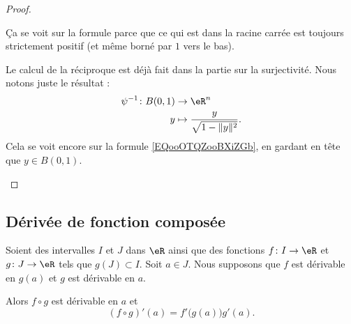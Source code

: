 \begin{proof}
\begin{subproof}
		Ça se voit sur la formule parce que ce qui est dans la racine carrée est toujours strictement positif (et même borné par \( 1\) vers le bas).

		Le calcul de la réciproque est déjà fait dans la partie sur la surjectivité. Nous notons juste le résultat :
		\begin{equation}		\label{EQooOTQZooBXiZGb}
			\begin{aligned}
				\psi^{-1}\colon B(0,1) & \to \eR^n                                   \\
				y                      & \mapsto \frac{ y }{ \sqrt{ 1-\| y \|^2 } }.
			\end{aligned}
		\end{equation}
		Cela se voit encore sur la formule \eqref{EQooOTQZooBXiZGb}, en gardant en tête que \( y\in B(0,1)\).
	\end{subproof}
\end{proof}

\subsection{Dérivée de fonction composée}

\begin{proposition}       \label{PROPooDONLooWthqRR}
	Soient des intervalles \( I\) et \( J\) dans \( \eR\) ainsi que des fonctions \( f\colon I\to \eR\) et \( g\colon J\to \eR\) tels que \( g(J)\subset I\). Soit \( a\in J\). Nous supposons que \( f\) est dérivable en \( g(a)\) et \( g\) est dérivable en \( a\).

	Alors \( f\circ g\) est dérivable en \( a\) et
	\begin{equation}
		(f\circ g)'(a)=f'\big( g(a) \big)g'(a).
	\end{equation}
\end{proposition}

